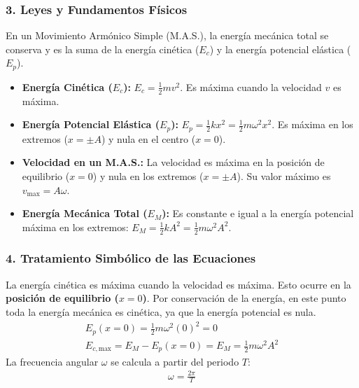 \subsubsection*{3. Leyes y Fundamentos Físicos}
En un Movimiento Armónico Simple (M.A.S.), la energía mecánica total se conserva y es la suma de la energía cinética ($E_c$) y la energía potencial elástica ($E_p$).
\begin{itemize}
    \item \textbf{Energía Cinética ($E_c$):} $E_c = \frac{1}{2}mv^2$. Es máxima cuando la velocidad $v$ es máxima.
    \item \textbf{Energía Potencial Elástica ($E_p$):} $E_p = \frac{1}{2}kx^2 = \frac{1}{2}m\omega^2x^2$. Es máxima en los extremos ($x=\pm A$) y nula en el centro ($x=0$).
    \item \textbf{Velocidad en un M.A.S.:} La velocidad es máxima en la posición de equilibrio ($x=0$) y nula en los extremos ($x=\pm A$). Su valor máximo es $v_{\text{max}} = A\omega$.
    \item \textbf{Energía Mecánica Total ($E_M$):} Es constante e igual a la energía potencial máxima en los extremos: $E_M = \frac{1}{2}kA^2 = \frac{1}{2}m\omega^2A^2$.
\end{itemize}

\subsubsection*{4. Tratamiento Simbólico de las Ecuaciones}
La energía cinética es máxima cuando la velocidad es máxima. Esto ocurre en la \textbf{posición de equilibrio ($x=0$)}.
Por conservación de la energía, en este punto toda la energía mecánica es cinética, ya que la energía potencial es nula.
\begin{gather}
    E_{p}(x=0) = \frac{1}{2}m\omega^2(0)^2 = 0 \\
    E_{c, \text{max}} = E_M - E_{p}(x=0) = E_M = \frac{1}{2}m\omega^2A^2
\end{gather}
La frecuencia angular $\omega$ se calcula a partir del periodo $T$:
\begin{gather}
    \omega = \frac{2\pi}{T}
\end{gather}

